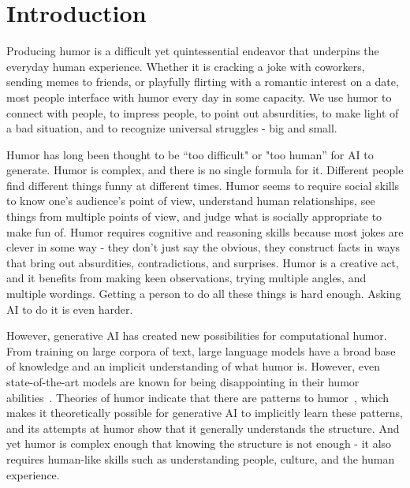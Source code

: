 \section{Introduction}
Producing humor is a difficult yet quintessential endeavor that underpins the everyday human experience. Whether it is cracking a joke with coworkers, sending memes to friends, or playfully flirting with a romantic interest on a date, most people interface with humor every day in some capacity. We use humor to connect with people, to impress people, to point out absurdities, to make light of a bad situation, and to recognize universal struggles - big and small. 

Humor has long been thought to be “too difficult" or "too human” for AI to generate. Humor is complex, and there is no single formula for it. Different people find different things funny at different times. 
Humor seems to require social skills to know one's audience's point of view, understand human relationships, see things from multiple points of view, and judge what is socially appropriate to make fun of. 
Humor requires cognitive and reasoning skills because most jokes are clever in some way - they don't just say the obvious, they construct facts in ways that bring out absurdities, contradictions, and surprises.
Humor is a creative act, and it benefits from making keen observations, trying multiple angles, and multiple wordings.
Getting a person to do all these things is hard enough. Asking AI to do it is even harder.

However, generative AI has created new possibilities for computational humor. From training on large corpora of text, large language models have a broad base of knowledge and an implicit understanding of what humor is. However, even state-of-the-art models are known for being disappointing in their humor abilities~\cite{gptnotfunny}. Theories of humor indicate that there are patterns to humor~\cite{humor_Raskin2009}, which makes it theoretically possible for generative AI to implicitly learn these patterns, and its attempts at humor show that it generally understands the structure. And yet humor is complex enough that knowing the structure is not enough - it also requires human-like skills such as understanding people, culture, and the human experience. 
\color{black}

